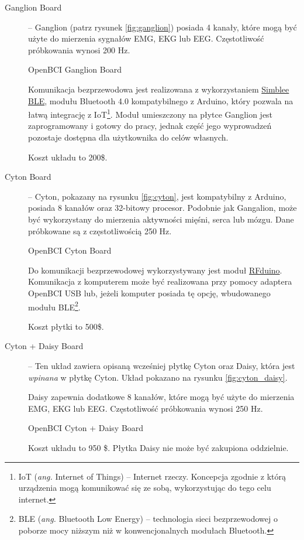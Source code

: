 \documentclass[skorowidz,skroty]{dyplomWEZUT}
\begin{document}
\begin{description}
    \item [Ganglion Board] -- Ganglion (patrz rysunek \vref{fig:ganglion}) posiada 4 kanały, które mogą być użyte do mierzenia sygnałów EMG, EKG lub EEG\cite{ganglion_shop}. Częstotliwość próbkowania wynosi 200 Hz.

    {OpenBCI Ganglion Board\label{fig:ganglion}}
    {\cite{ganglion_shop}}

    Komunikacja bezprzewodowa jest realizowana z wykorzystaniem \href{https://www.sparkfun.com/simblee}{Simblee BLE}, modułu Bluetooth 4.0 kompatybilnego z Arduino, który pozwala na łatwą integrację z IoT\footnote{IoT (\textit{ang.} Internet of Things) -- Internet rzeczy. Koncepcja zgodnie z którą urządzenia mogą komunikować się ze sobą, wykorzystując do tego celu internet.}. Moduł umieszczony na płytce Ganglion jest zaprogramowany i gotowy do pracy, jednak część jego wyprowadzeń pozostaje dostępna dla użytkownika do celów własnych.

    Koszt układu to 200\$.

    \item[Cyton Board] -- Cyton, pokazany na rysunku \vref{fig:cyton}, jest kompatybilny z Arduino, posiada 8 kanałów oraz 32-bitowy procesor\cite{cyton_shop}. Podobnie jak Gangalion, może być wykorzystany do mierzenia aktywności mięśni, serca lub mózgu. Dane próbkowane są z częstotliwością 250 Hz.

    {OpenBCI Cyton Board\label{fig:cyton}}
    {\cite{cyton_shop}}

    Do komunikacji bezprzewodowej wykorzystywany jest moduł \href{https://eu.mouser.com/new/rfdigital/rf-digital-rfduino/}{RFduino}. Komunikacja z komputerem może być realizowana przy pomocy adaptera OpenBCI USB lub, jeżeli komputer posiada tę opcję, wbudowanego modułu BLE\footnote{BLE (\textit{ang.} Bluetooth Low Energy) -- technologia sieci bezprzewodowej o poborze mocy niższym niż w konwencjonalnych modułach Bluetooth.}.

    Koszt płytki to 500\$.

    \item[Cyton + Daisy Board] -- Ten układ zawiera opisaną wcześniej płytkę Cyton oraz Daisy, która jest \textit{wpinana} w płytkę Cyton. Układ pokazano na rysunku \vref{fig:cyton_daisy}.

    Daisy zapewnia dodatkowe 8 kanałów, które mogą być użyte do mierzenia EMG, EKG lub EEG\cite{cytondaisy_shop}. Częstotliwość próbkowania wynosi 250 Hz.

    {OpenBCI Cyton + Daisy Board\label{fig:cyton_daisy}}
    {\cite{cytondaisy_shop}}

    Koszt układu to 950 \$. Płytka Daisy nie może być zakupiona oddzielnie.
\end{description}
\end{document}
